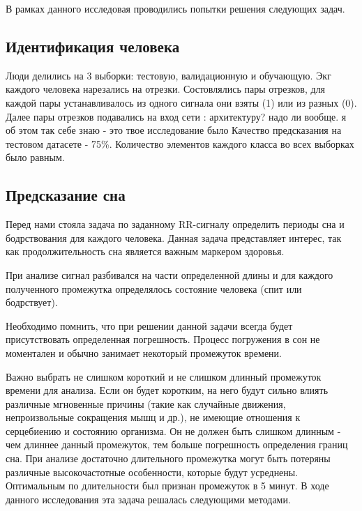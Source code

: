 В рамках данного исследовая проводились попытки решения следующих задач.
\subsection{Идентификация человека}
Люди делились на 3 выборки: тестовую, валидационную и обучающую. Экг каждого человека нарезались на отрезки. Состовлялись пары отрезков, для каждой пары устанавливалось из одного сигнала они взяты (1) или из разных (0). Далее пары отрезков подавались на вход сети :
 архитектуру? надо ли вообще. я об этом так себе знаю - это твое исследование было
Качество предсказания на тестовом датасете - 75\%. Количество элементов каждого класса во всех выборках было равным.
\subsection{Предсказание сна}
Перед нами стояла задача по заданному RR-сигналу определить периоды сна и бодрствования для каждого человека. Данная задача представляет интерес, так как продолжительность сна является важным маркером здоровья.

При анализе сигнал разбивался на части определенной длины и для каждого полученного промежутка определялось состояние человека (спит или бодрствует). 

Необходимо помнить, что при решении данной задачи всегда будет присутствовать определенная погрешность. Процесс погружения в сон не моментален и обычно занимает некоторый промежуток времени.

Важно выбрать не слишком короткий и не слишком длинный промежуток времени для анализа. Если он будет коротким, на него будут сильно влиять различные мгновенные причины (такие как случайные движения, непроизвольные сокращения мышц и др.), не имеющие отношения к серцебиению и состоянию организма. Он не должен быть слишком длинным - чем длиннее данный промежуток, тем больше погрешность определения границ сна. При анализе достаточно длительного промежутка могут быть потеряны различные высокочастотные особенности, которые будут усреднены. Оптимальным по длительности был признан промежуток в 5 минут.
В ходе данного исследования эта задача решалась следующими методами.

